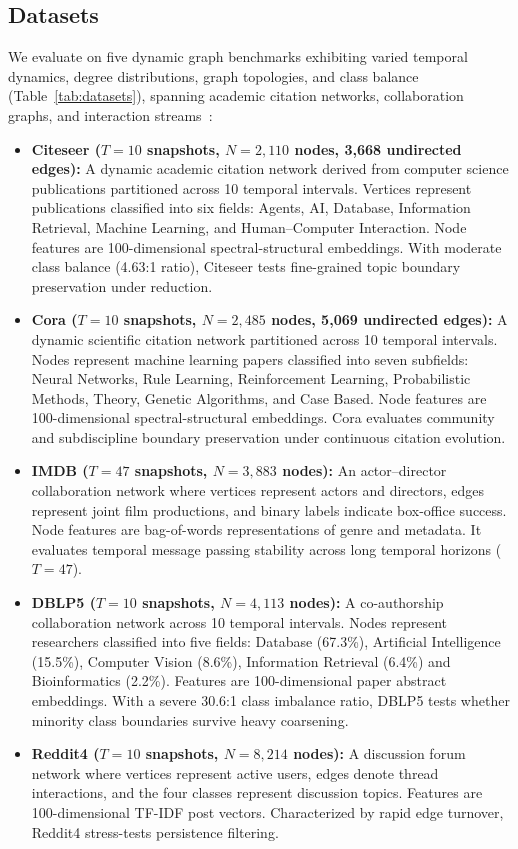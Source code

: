 \documentclass[sigconf]{acmart}
\begin{document}
\subsection{Datasets}
\label{sec:datasets}
We evaluate on five dynamic graph benchmarks exhibiting varied temporal dynamics, degree distributions, graph topologies, and class balance (Table~\ref{tab:datasets}), spanning academic citation networks, collaboration graphs, and interaction streams~\cite{pareja2020evolvegcn,sacod2026}:
\begin{itemize}
    \item \textbf{Citeseer ($T = 10$ snapshots, $N = 2,110$ nodes, 3,668 undirected edges):} A dynamic academic citation network derived from computer science publications partitioned across 10 temporal intervals. Vertices represent publications classified into six fields: Agents, AI, Database, Information Retrieval, Machine Learning, and Human--Computer Interaction. Node features are 100-dimensional spectral-structural embeddings. With moderate class balance (4.63:1 ratio), Citeseer tests fine-grained topic boundary preservation under reduction.
    \item \textbf{Cora ($T = 10$ snapshots, $N = 2,485$ nodes, 5,069 undirected edges):} A dynamic scientific citation network partitioned across 10 temporal intervals. Nodes represent machine learning papers classified into seven subfields: Neural Networks, Rule Learning, Reinforcement Learning, Probabilistic Methods, Theory, Genetic Algorithms, and Case Based. Node features are 100-dimensional spectral-structural embeddings. Cora evaluates community and subdiscipline boundary preservation under continuous citation evolution.
    \item \textbf{IMDB ($T = 47$ snapshots, $N = 3,883$ nodes):} An actor--director collaboration network where vertices represent actors and directors, edges represent joint film productions, and binary labels indicate box-office success. Node features are bag-of-words representations of genre and metadata. It evaluates temporal message passing stability across long temporal horizons ($T=47$).
    \item \textbf{DBLP5 ($T = 10$ snapshots, $N = 4,113$ nodes):} A co-authorship collaboration network across 10 temporal intervals. Nodes represent researchers classified into five fields: Database (67.3\%), Artificial Intelligence (15.5\%), Computer Vision (8.6\%), Information Retrieval (6.4\%) and Bioinformatics (2.2\%). Features are 100-dimensional paper abstract embeddings. With a severe 30.6:1 class imbalance ratio, DBLP5 tests whether minority class boundaries survive heavy coarsening.
    \item \textbf{Reddit4 ($T = 10$ snapshots, $N = 8,214$ nodes):} A discussion forum network where vertices represent active users, edges denote thread interactions, and the four classes represent discussion topics. Features are 100-dimensional TF-IDF post vectors. Characterized by rapid edge turnover, Reddit4 stress-tests persistence filtering.
\end{itemize}
\end{document}
